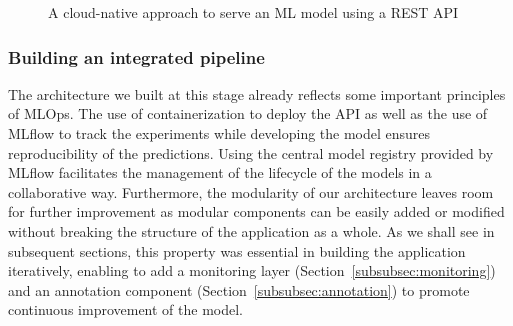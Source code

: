 \documentclass[graybox]{svmult}
\begin{document}
\begin{figure}[htbp]
    \centering
    \caption{A cloud-native approach to serve an ML model using a REST API}
    \label{fig:api-datalab}
\end{figure}

\subsubsection{Building an integrated pipeline}

The architecture we built at this stage already reflects some important principles of MLOps. The use of containerization to deploy the API as well as the use of MLflow to track the experiments while developing the model ensures reproducibility of the predictions. Using the central model registry provided by MLflow facilitates the management of the lifecycle of the models in a collaborative way. Furthermore, the modularity of our architecture leaves room for further improvement as modular components can be easily added or modified without breaking the structure of the application as a whole. As we shall see in subsequent sections, this property was essential in building the application iteratively, enabling to add a monitoring layer (Section~\ref{subsubsec:monitoring}) and an annotation component (Section~\ref{subsubsec:annotation}) to promote continuous improvement of the model.
\end{document}
